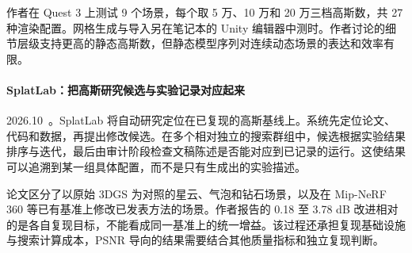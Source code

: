 作者在 Quest 3 上测试 9 个场景，每个取 5 万、10 万和 20 万三档高斯数，共 27 种渲染配置。网格生成与导入另在笔记本的 Unity 编辑器中测时。作者讨论的细节层级支持更高的静态高斯数，但静态模型序列对连续动态场景的表达和效率有限。

\paragraph{SplatLab：把高斯研究候选与实验记录对应起来}
2026.10~\cite{2610_30468}。SplatLab 将自动研究定位在已复现的高斯基线上。系统先定位论文、代码和数据，再提出修改候选。在多个相对独立的搜索群组中，候选根据实验结果排序与迭代，最后由审计阶段检查文稿陈述是否能对应到已记录的运行。这使结果可以追溯到某一组具体配置，而不是只有生成出的实验描述。

论文区分了以原始 3DGS 为对照的星云、气泡和钻石场景，以及在 Mip-NeRF 360 等已有基准上修改已发表方法的场景。作者报告的 0.18 至 3.78 dB 改进相对的是各自复现目标，不能看成同一基准上的统一增益。该过程还承担复现基础设施与搜索计算成本，PSNR 导向的结果需要结合其他质量指标和独立复现判断。
